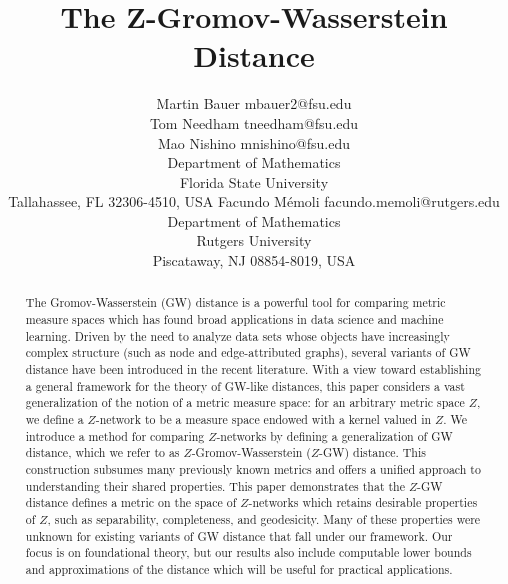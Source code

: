 \documentclass[twoside,11pt]{article}
\theoremstyle{definition}
\begin{document}
\title{The Z-Gromov-Wasserstein Distance}

\author{%
\name Martin Bauer \email mbauer2@fsu.edu\\[0.2em]
\name Tom Needham \email tneedham@fsu.edu\\[0.2em]
\name Mao Nishino \email mnishino@fsu.edu\\[0.2em]
\addr Department of Mathematics\\
Florida State University\\
Tallahassee, FL 32306-4510, USA
\AND
\name Facundo M\'{e}moli \email facundo.memoli@rutgers.edu\\[0.2em]
\addr Department of Mathematics\\
Rutgers University\\
Piscataway, NJ 08854-8019, USA
}


\maketitle

\begin{abstract}%
The Gromov-Wasserstein (GW) distance is a powerful tool for comparing metric measure spaces which has found broad applications in data science and machine learning. Driven by the need to analyze data sets whose objects have increasingly complex structure (such as node and edge-attributed graphs), several variants of GW distance have been introduced in the recent literature. With a view toward establishing a general framework for the theory of GW-like distances, this paper considers a vast generalization of the notion of a metric measure space: for an arbitrary metric space $Z$, we define a $Z$-network to be a measure space endowed with a kernel valued in $Z$.  We introduce a method for comparing $Z$-networks by defining a generalization of GW distance, which we refer to as $Z$-Gromov-Wasserstein ($Z$-GW) distance. This construction subsumes many previously known metrics and offers a unified approach to understanding their shared properties. This paper demonstrates that the $Z$-GW distance defines a metric on the space of $Z$-networks which retains desirable properties of $Z$, such as separability, completeness, and geodesicity. Many of these properties were unknown for existing variants of GW distance that fall under our framework. Our focus is on foundational theory, but our results also include computable lower bounds and approximations of the distance which will be useful for practical applications.
\end{abstract}
\end{document}
